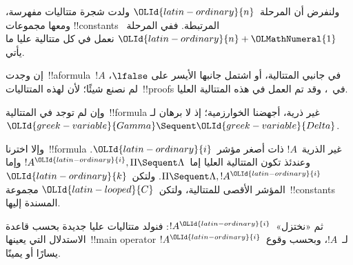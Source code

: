 \documentclass[../../../include/open-logic-section]{subfiles}
\begin{document}
ولنفرض أن المرحلة~$\OLId{latin-ordinary}{n}$ ولدت شجرة متتاليات مفهرسة، ومعها مجموعات
!!{constant}s المرتبطة. ففي المرحلة~$\OLId{latin-ordinary}{n}+\OLMathNumeral{1}$ نعمل في كل متتالية عليا ما يأتي.

إن وجدت~!!a{formula}~$!A$ في جانبي المتتالية، أو اشتمل جانبها الأيسر على
$\lfalse$، لم نصنع شيئًا؛ لأن لهذه المتتاليات~!!{proof}s في~،
وقد تم العمل في هذه المتتالية العليا.

وإن لم توجد في المتتالية~!!{formula} غير ذرية، أجهضنا الخوارزمية؛ إذ لا
برهان لـ~$\OLId{greek-variable}{Gamma}\Sequent\OLId{greek-variable}{Delta}$.

وإلا اخترنا~!!{formula} غير الذرية~$!A$ ذات أصغر مؤشر~$\OLId{latin-ordinary}{i}$. وعندئذ تكون
المتتالية العليا إما~$!A^\OLId{latin-ordinary}{i},\Pi\Sequent\Lambda$ وإما
$\Pi\Sequent\Lambda,!A^\OLId{latin-ordinary}{i}$. ولتكن~$\OLId{latin-ordinary}{k}$ المؤشر الأقصى للمتتالية، ولتكن~$\OLId{latin-looped}{C}$
مجموعة~!!{constant}s المسندة إليها.

ثم «نختزل»~$!A^\OLId{latin-ordinary}{i}$: فنولد متتاليات عليا جديدة بحسب قاعدة الاستدلال التي
يعينها~!!{main operator} لـ~$!A$، وبحسب وقوع~$!A^\OLId{latin-ordinary}{i}$ يسارًا أو يمينًا.
\end{document}
